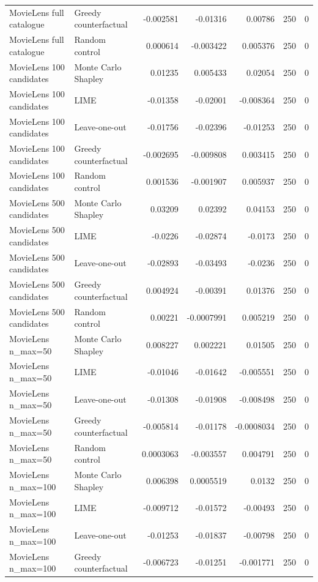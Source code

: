 \begin{table}[t]
{\begin{tabular}{llrrrrr}
MovieLens full catalogue & Greedy counterfactual & -0.002581 & -0.01316 & 0.00786 & 250 & 0 \\
MovieLens full catalogue & Random control & 0.000614 & -0.003422 & 0.005376 & 250 & 0 \\
MovieLens 100 candidates & Monte Carlo Shapley & 0.01235 & 0.005433 & 0.02054 & 250 & 0 \\
MovieLens 100 candidates & LIME & -0.01358 & -0.02001 & -0.008364 & 250 & 0 \\
MovieLens 100 candidates & Leave-one-out & -0.01756 & -0.02396 & -0.01253 & 250 & 0 \\
MovieLens 100 candidates & Greedy counterfactual & -0.002695 & -0.009808 & 0.003415 & 250 & 0 \\
MovieLens 100 candidates & Random control & 0.001536 & -0.001907 & 0.005937 & 250 & 0 \\
MovieLens 500 candidates & Monte Carlo Shapley & 0.03209 & 0.02392 & 0.04153 & 250 & 0 \\
MovieLens 500 candidates & LIME & -0.0226 & -0.02874 & -0.0173 & 250 & 0 \\
MovieLens 500 candidates & Leave-one-out & -0.02893 & -0.03493 & -0.0236 & 250 & 0 \\
MovieLens 500 candidates & Greedy counterfactual & 0.004924 & -0.00391 & 0.01376 & 250 & 0 \\
MovieLens 500 candidates & Random control & 0.00221 & -0.0007991 & 0.005219 & 250 & 0 \\
MovieLens n\_max=50 & Monte Carlo Shapley & 0.008227 & 0.002221 & 0.01505 & 250 & 0 \\
MovieLens n\_max=50 & LIME & -0.01046 & -0.01642 & -0.005551 & 250 & 0 \\
MovieLens n\_max=50 & Leave-one-out & -0.01308 & -0.01908 & -0.008498 & 250 & 0 \\
MovieLens n\_max=50 & Greedy counterfactual & -0.005814 & -0.01178 & -0.0008034 & 250 & 0 \\
MovieLens n\_max=50 & Random control & 0.0003063 & -0.003557 & 0.004791 & 250 & 0 \\
MovieLens n\_max=100 & Monte Carlo Shapley & 0.006398 & 0.0005519 & 0.0132 & 250 & 0 \\
MovieLens n\_max=100 & LIME & -0.009712 & -0.01572 & -0.00493 & 250 & 0 \\
MovieLens n\_max=100 & Leave-one-out & -0.01253 & -0.01837 & -0.00798 & 250 & 0 \\
MovieLens n\_max=100 & Greedy counterfactual & -0.006723 & -0.01251 & -0.001771 & 250 & 0 \\

\end{tabular}}
\end{table}
